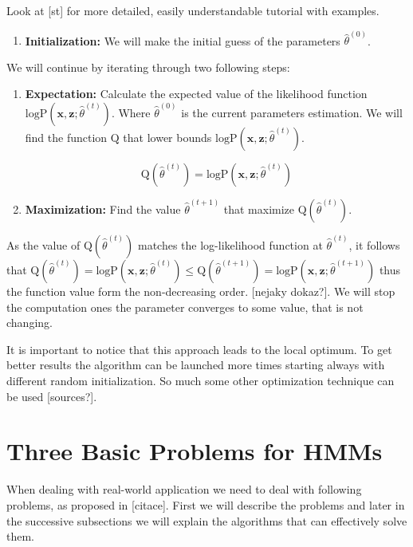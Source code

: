 \documentclass[thesis=M,english]{FITthesis}[2012/10/20]
\begin{document}
Look at [st] for more detailed, easily understandable tutorial with examples.    

\begin{enumerate}
\item \textbf{Initialization:} We will make the initial guess of the parameters $\hat \theta^{(0)} $.
\end{enumerate} 

We will continue by iterating through two following steps: 

\begin{enumerate}[resume]
\item \textbf{Expectation:} Calculate the expected value of the likelihood function $\mathrm{logP}(\mathbf{x},\mathbf{z};\hat \theta^{(t)})$. Where $\hat \theta^{(0)}$ is the current parameters estimation. We will find the function $\mathrm{Q}$ that lower bounds $\mathrm{logP}(\mathbf{x},\mathbf{z};\hat \theta^{(t)})$.

\begin{equation}\label{eq:exp}
 \mathrm{Q}(\hat\theta^{(t)}) =  \mathrm{logP}(\mathbf{x},\mathbf{z};\hat \theta^{(t)})
\end{equation}

\item \textbf{Maximization:} Find the value $\hat\theta^{(t+1)}$ that maximize $\mathrm{Q}(\hat\theta^{(t)})$.  
\end{enumerate}  

As the value of $\mathrm{Q}(\hat\theta^{(t)})$ matches the log-likelihood function at $\hat\theta^{(t)}$, it follows that $ \mathrm{Q}(\hat\theta^{(t)}) =  \mathrm{logP}(\mathbf{x},\mathbf{z};\hat \theta^{(t)}) \leq \mathrm{Q}(\hat\theta^{(t+1)}) =  \mathrm{logP}(\mathbf{x},\mathbf{z};\hat \theta^{(t+1)}) $ thus the function value form the non-decreasing order. [nejaky dokaz?]. We will stop the computation ones the parameter converges to some value, that is not changing.  

It is important to notice that this approach leads to the local optimum. To get better results the algorithm can be launched more times starting always with different random initialization. So much some other optimization technique can be used [sources?]. 

\section{Three Basic Problems for HMMs}\label{sec:3p}
When dealing with real-world application we need to deal with following problems, as proposed in [citace]. First we will describe the problems and later in the successive subsections we will explain the algorithms that can effectively solve them. 
\end{document}
